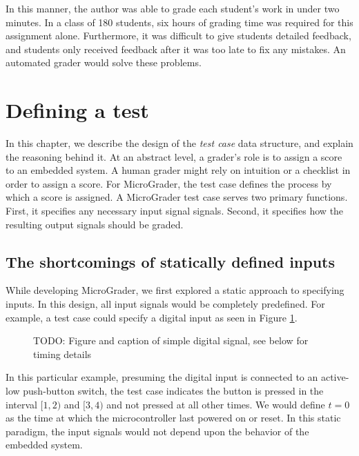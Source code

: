 \documentclass[12pt]{article}
\begin{document}
In this manner, the author was able to grade each student's work in under two minutes.  In a class of 180 students, six hours of grading time was required for this assignment alone.  Furthermore, it was difficult to give students detailed feedback, and students only received feedback after it was too late to fix any mistakes.  An automated grader would solve these problems.

\newpage
\section{Defining a test}
In this chapter, we describe the design of the \textit{test case} data structure, and explain the reasoning behind it.  At an abstract level, a grader's role is to assign a score to an embedded system.  A human grader might rely on intuition or a checklist in order to assign a score.  For MicroGrader, the test case defines the process by which a score is assigned.  A MicroGrader test case serves two primary functions.  First, it specifies any necessary input signal signals.  Second, it specifies how the resulting output signals should be graded.

\subsection{The shortcomings of statically defined inputs}
While developing MicroGrader, we first explored a static approach to specifying inputs.  In this design, all input signals would be completely predefined.  For example, a test case could specify a digital input as seen in Figure \ref{fig:static-input}.

\begin{figure}[h]
\centering
\vspace{5mm}
\caption{TODO: Figure and caption of simple digital signal, see below for timing details}
\label{fig:static-input}
\end{figure}

In this particular example, presuming the digital input is connected to an active-low push-button switch, the test case indicates the button is pressed in the interval $[1,2)$ and $[3,4)$ and not pressed at all other times.  We would define $t=0$ as the time at which the microcontroller last powered on or reset.  In this static paradigm, the input signals would not depend upon the behavior of the embedded system.
\end{document}
